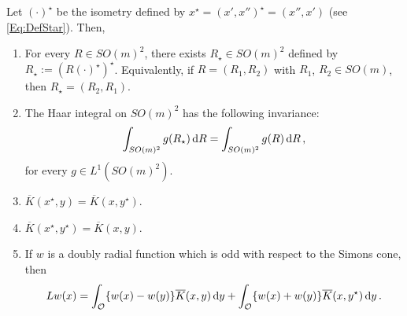 \begin{lemma}
	\label{Lemma:PropertiesStar}
	Let $(\cdot)^\star$ be the isometry defined by $x^\star = (x',x'')^\star = (x'', x')$ (see \eqref{Eq:DefStar}).
	Then, 
	\begin{enumerate}
		\item 	
		For every $R\in SO(m)^2$, there exists  $R_\star\in SO(m)^2$ defined by $R_\star := (R(\cdot)^\star)^\star$. Equivalently, if $R = (R_1, R_2)$ with $R_1$, $R_2 \in SO(m)$, then $R_\star = (R_2, R_1)$.
        \item
        The Haar integral on $SO(m)^2$ has the following invariance:
        \begin{equation}
   		\label{Eq:InvarianceByStar}
        \int_{SO(m)^2} g(R_\star) \,\mathrm{d} R = \int_{SO(m)^2} g(R) \,\mathrm{d} R \,,
        \end{equation}
        for every $g \in L^1(SO(m)^2)$.
        \item $\overline{K}(x^\star,y) = \overline{K} (x,y^\star)$.
        \item $\overline{K}(x^\star,y^\star) = \overline{K} (x,y)$.
		\item If $w$ is a doubly radial function which is odd with respect to the Simons cone, then
		$$
		Lw (x) = \int_{\mathcal{O}} \{w(x) - w(y) \} \overline{K}(x, y) \,\mathrm{d} y +  \int_{\mathcal{O}} \{w(x) + w(y) \} \overline{K}(x, y^\star) \,\mathrm{d} y \,.
		$$
	\end{enumerate}
\end{lemma}

